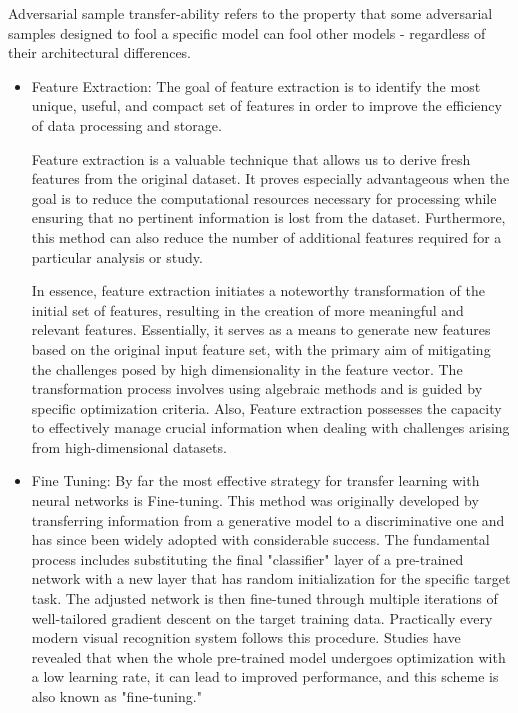 \documentclass{article}
\begin{document}
\setlength{\parskip}{10pt}
\begingroup
\raggedright
Adversarial sample transfer-ability refers to the property that some adversarial samples designed to fool a specific model can fool other models - regardless of their architectural differences. \cite{goodfellow2015explaining}
\endgroup

\begin{itemize}
    \item
    Feature Extraction:
    The goal of feature extraction is to identify the most unique, useful, and compact set of features in order to improve the efficiency of data processing and storage.\cite{zebari2020comprehensive} 

    \begingroup
    \raggedright
    Feature extraction is a valuable technique that allows us to derive fresh features from the original dataset. It proves especially advantageous when the goal is to reduce the computational resources necessary for processing while ensuring that no pertinent information is lost from the dataset. Furthermore, this method can also reduce the number of additional features required for a particular analysis or study.
    \endgroup

    \begingroup
    \raggedright
    In essence, feature extraction initiates a noteworthy transformation of the initial set of features, resulting in the creation of more meaningful and relevant features. Essentially, it serves as a means to generate new features based on the original input feature set, with the primary aim of mitigating the challenges posed by high dimensionality in the feature vector.
    The transformation process involves using algebraic methods and is guided by specific optimization criteria.\cite{zebari2020comprehensive}\cite{elhadad2017novel}\cite{Zebari2019EnhanceTM} Also, Feature extraction possesses the capacity to effectively manage crucial information when dealing with challenges arising from high-dimensional datasets. \cite{moghaddam2020feature}\cite{sulaiman2019unsupervised}
    \endgroup
        

		
    \item
    Fine Tuning:
    By far the most effective strategy for transfer learning with neural networks is Fine-tuning.\cite{oquab2014learning} This method was originally developed by transferring information from a generative model to a discriminative one and has since been widely adopted with considerable success. The fundamental process includes substituting the final "classifier" layer of a pre-trained network with a new layer that has random initialization for the specific target task. The adjusted network is then fine-tuned through multiple iterations of well-tailored gradient descent on the target training data. Practically every modern visual recognition system follows this procedure. \cite{wang2019growing}
    Studies have revealed that when the whole pre-trained model undergoes optimization with a low learning rate, it can lead to improved performance, and this scheme is also known as "fine-tuning." \cite{chin2021renofeation}
\end{itemize}
\end{document}
